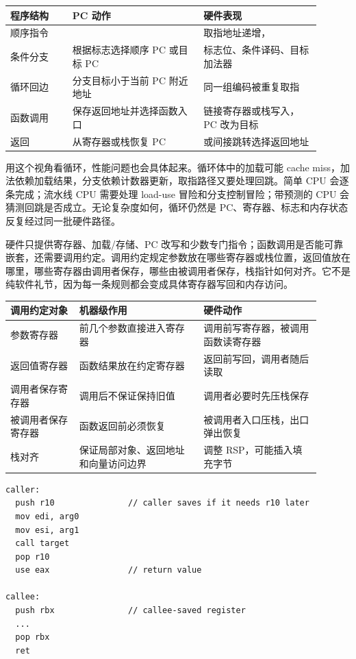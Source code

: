 \begin{longtable}{L{0.18\linewidth}L{0.38\linewidth}L{0.34\linewidth}}
\toprule
程序结构 & PC 动作 & 硬件表现 \\
\midrule
顺序指令 &  & 取指地址递增， \\\tablerowrule
条件分支 & 根据标志选择顺序 PC 或目标 PC & 标志位、条件译码、目标加法器 \\\tablerowrule
循环回边 & 分支目标小于当前 PC 附近地址 & 同一组编码被重复取指 \\\tablerowrule
函数调用 & 保存返回地址并选择函数入口 & 链接寄存器或栈写入，PC 改为目标 \\\tablerowrule
返回 & 从寄存器或栈恢复 PC &  或间接跳转选择返回地址 \\
\bottomrule
\end{longtable}

用这个视角看循环，性能问题也会具体起来。循环体中的加载可能 cache miss，加法依赖加载结果，分支依赖计数器更新，取指路径又要处理回跳。简单 CPU 会逐条完成；流水线 CPU 需要处理 load-use 冒险和分支控制冒险；带预测的 CPU 会猜测回跳是否成立。无论复杂度如何，循环仍然是 PC、寄存器、标志和内存状态反复经过同一批硬件路径。

硬件只提供寄存器、加载/存储、PC 改写和少数专门指令；函数调用是否能可靠嵌套，还需要调用约定。调用约定规定参数放在哪些寄存器或栈位置，返回值放在哪里，哪些寄存器由调用者保存，哪些由被调用者保存，栈指针如何对齐。它不是纯软件礼节，因为每一条规则都会变成具体寄存器写回和内存访问。

\begin{longtable}{L{0.2\linewidth}L{0.36\linewidth}L{0.34\linewidth}}
\toprule
调用约定对象 & 机器级作用 & 硬件动作 \\
\midrule
参数寄存器 & 前几个参数直接进入寄存器 & 调用前写寄存器，被调用函数读寄存器 \\\tablerowrule
返回值寄存器 & 函数结果放在约定寄存器 & 返回前写回，调用者随后读取 \\\tablerowrule
调用者保存寄存器 & 调用后不保证保持旧值 & 调用者必要时先压栈保存 \\\tablerowrule
被调用者保存寄存器 & 函数返回前必须恢复 & 被调用者入口压栈，出口弹出恢复 \\\tablerowrule
栈对齐 & 保证局部对象、返回地址和向量访问边界 & 调整 RSP，可能插入填充字节 \\
\bottomrule
\end{longtable}

\begin{lstlisting}
caller:
  push r10               // caller saves if it needs r10 later
  mov edi, arg0
  mov esi, arg1
  call target
  pop r10
  use eax                // return value

callee:
  push rbx               // callee-saved register
  ...
  pop rbx
  ret
\end{lstlisting}

